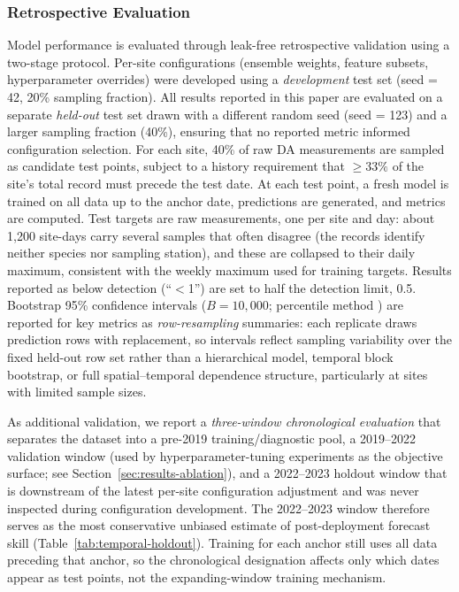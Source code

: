 \documentclass[toxins,article,submit,moreauthors]{Definitions/mdpi}
\begin{document}
\subsubsection{Retrospective Evaluation}
\label{sec:retro-eval}

Model performance is evaluated through leak-free retrospective validation using a two-stage protocol. Per-site configurations (ensemble weights, feature subsets, hyperparameter overrides) were developed using a \textit{development} test set (seed = 42, 20\% sampling fraction). All results reported in this paper are evaluated on a separate \textit{held-out} test set drawn with a different random seed (seed = 123) and a larger sampling fraction (40\%), ensuring that no reported metric informed configuration selection. For each site, 40\% of raw DA measurements are sampled as candidate test points, subject to a history requirement that $\geq 33\%$ of the site's total record must precede the test date. At each test point, a fresh model is trained on all data up to the anchor date, predictions are generated, and metrics are computed. Test targets are raw measurements, one per site and day: about 1,200 site-days carry several samples that often disagree (the records identify neither species nor sampling station), and these are collapsed to their daily maximum, consistent with the weekly maximum used for training targets. Results reported as below detection (``$<$1'') are set to half the detection limit, \SI{0.5}{\microgrampeg}. Bootstrap 95\% confidence intervals ($B = 10{,}000$; percentile method \cite{Efron1979}) are reported for key metrics as \emph{row-resampling} summaries: each replicate draws prediction rows with replacement, so intervals reflect sampling variability over the fixed held-out row set rather than a hierarchical model, temporal block bootstrap, or full spatial--temporal dependence structure, particularly at sites with limited sample sizes.

As additional validation, we report a \textit{three-window chronological evaluation} that separates the dataset into a pre-2019 training/diagnostic pool, a 2019--2022 validation window (used by hyperparameter-tuning experiments as the objective surface; see Section~\ref{sec:results-ablation}), and a 2022--2023 holdout window that is downstream of the latest per-site configuration adjustment and was never inspected during configuration development. The 2022--2023 window therefore serves as the most conservative unbiased estimate of post-deployment forecast skill (Table~\ref{tab:temporal-holdout}). Training for each anchor still uses all data preceding that anchor, so the chronological designation affects only which dates appear as test points, not the expanding-window training mechanism.
\end{document}

